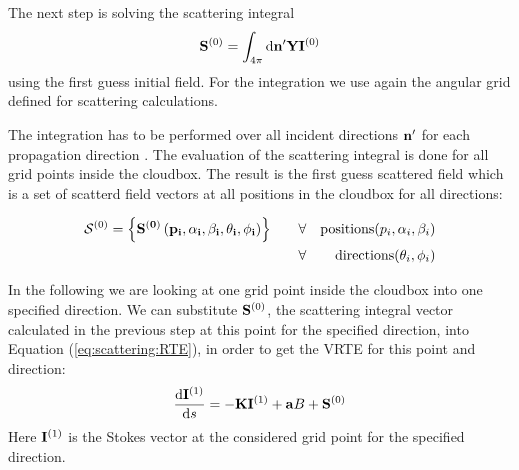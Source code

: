 
The next step is solving the scattering integral
\begin{eqnarray}
  {\bf S}^{(0)} = \int_{4\pi} \mathrm{d} {\bf n}^\prime
  {\bf Y} {\bf I}^{(0)}
\label{eq:scat_int}
\end{eqnarray}
using the first guess initial field. For the integration we use again
the angular grid defined for scattering calculations.

The integration has to be performed over all incident directions
${\bf n}^\prime$ for each propagation direction \PDir{}. The evaluation
of the scattering integral is done for all grid points inside the
cloudbox. The result is the first guess scattered field 
which is a set of scatterd field vectors at all positions in the
cloudbox for all directions:

\begin{eqnarray}
{\mathcal S}^{(0)} = \left\{ \bf{S}^{(0)} \left( p_i, \alpha_i, \beta_i, \theta_i, \phi_i\right)\right\}  \qquad  
&\forall& {\rm positions } (p_i,\alpha_i, \beta_i)\\
&\forall& {\rm directions } (\theta_i,\phi_i)
\end{eqnarray}


\label{scattering:av_coeff}

In the following we are looking at one grid point inside the cloudbox
into one specified direction.  We can substitute ${\bf S}^{(0)}$, the
scattering integral vector calculated in the previous step at this
point for the specified direction, into Equation
(\ref{eq:scattering:RTE}), in order to get the VRTE for this point and
direction:
\begin{eqnarray}
     \frac{\mathrm{d} {\bf I}^{(1)}}{\mathrm{d} s} =
     -{\bf K} {\bf I}^{(1)} + {\bf a} B
     +{\bf S}^{(0)}
\label{eq:scattering:vrte_fs}
\end{eqnarray} 
Here ${\bf I}^{(1)}$ is the Stokes vector at the considered grid point
for the specified direction.

